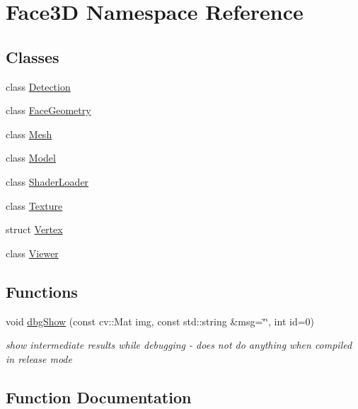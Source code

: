 \hypertarget{namespace_face3_d}{}\section{Face3D Namespace Reference}
\label{namespace_face3_d}
\subsection*{Classes}
\begin{DoxyCompactItemize}
\item 
class \hyperlink{class_face3_d_1_1_detection}{Detection}
\item 
class \hyperlink{class_face3_d_1_1_face_geometry}{Face\+Geometry}
\item 
class \hyperlink{class_face3_d_1_1_mesh}{Mesh}
\item 
class \hyperlink{class_face3_d_1_1_model}{Model}
\item 
class \hyperlink{class_face3_d_1_1_shader_loader}{Shader\+Loader}
\item 
class \hyperlink{class_face3_d_1_1_texture}{Texture}
\item 
struct \hyperlink{struct_face3_d_1_1_vertex}{Vertex}
\item 
class \hyperlink{class_face3_d_1_1_viewer}{Viewer}
\end{DoxyCompactItemize}
\subsection*{Functions}
\begin{DoxyCompactItemize}
\item 
void \hyperlink{namespace_face3_d_a3b895408a6257eb9b7cfdbaec770e356}{dbg\+Show} (const cv\+::\+Mat img, const std\+::string \&msg=\char`\"{}\char`\"{}, int id=0)
\begin{DoxyCompactList}\small\item\em show intermediate results while debugging -\/ does not do anything when compiled in release mode \end{DoxyCompactList}\end{DoxyCompactItemize}


\subsection{Function Documentation}
